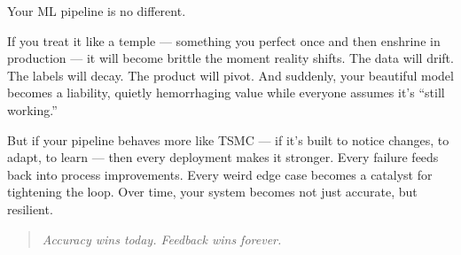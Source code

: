 Your ML pipeline is no different.

If you treat it like a temple — something you perfect once and then enshrine in production — it will become brittle the moment reality shifts. The data will drift. The labels will decay. The product will pivot. And suddenly, your beautiful model becomes a liability, quietly hemorrhaging value while everyone assumes it's “still working.”

But if your pipeline behaves more like TSMC — if it’s built to notice changes, to adapt, to learn — then every deployment makes it stronger. Every failure feeds back into process improvements. Every weird edge case becomes a catalyst for tightening the loop. Over time, your system becomes not just accurate, but resilient.

\begin{quote}
\textit{Accuracy wins today. Feedback wins forever.}
\end{quote}



